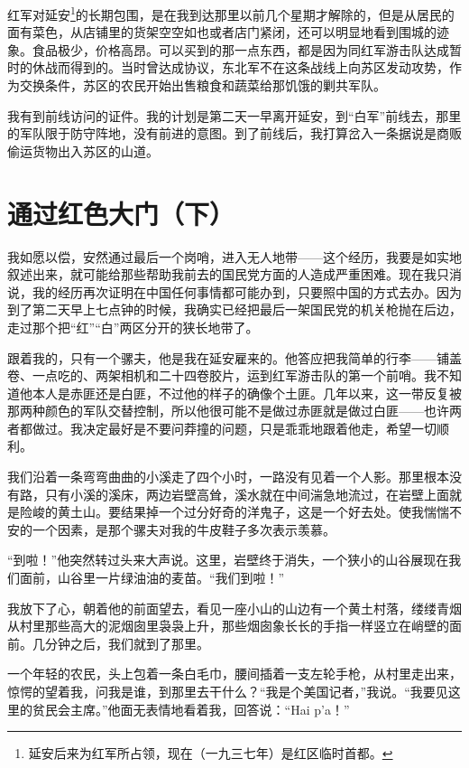 \documentclass[10pt]{book}
\begin{document}
红军对延安\footnote{延安后来为红军所占领，现在（一九三七年）是红区临时首都。}的长期包围，是在我到达那里以前几个星期才解除的，但是从居民的面有菜色，从店铺里的货架空空如也或者店门紧闭，还可以明显地看到围城的迹象。食品极少，价格高昂。可以买到的那一点东西，都是因为同红军游击队达成暂时的休战而得到的。当时曾达成协议，东北军不在这条战线上向苏区发动攻势，作为交换条件，苏区的农民开始出售粮食和蔬菜给那饥饿的剿共军队。

我有到前线访问的证件。我的计划是第二天一早离开延安，到“白军”前线去，那里的军队限于防守阵地，没有前进的意图。到了前线后，我打算岔入一条据说是商贩偷运货物出入苏区的山道。



\section{通过红色大门（下）}

我如愿以偿，安然通过最后一个岗哨，进入无人地带——这个经历，我要是如实地叙述出来，就可能给那些帮助我前去的国民党方面的人造成严重困难。现在我只消说，我的经历再次证明在中国任何事情都可能办到，只要照中国的方式去办。因为到了第二天早上七点钟的时候，我确实已经把最后一架国民党的机关枪抛在后边，走过那个把“红”“白”两区分开的狭长地带了。

跟着我的，只有一个骡夫，他是我在延安雇来的。他答应把我简单的行李——铺盖卷、一点吃的、两架相机和二十四卷胶片，运到红军游击队的第一个前哨。我不知道他本人是赤匪还是白匪，不过他的样子的确像个土匪。几年以来，这一带反复被那两种颜色的军队交替控制，所以他很可能不是做过赤匪就是做过白匪——也许两者都做过。我决定最好是不要问莽撞的问题，只是乖乖地跟着他走，希望一切顺利。

我们沿着一条弯弯曲曲的小溪走了四个小时，一路没有见着一个人影。那里根本没有路，只有小溪的溪床，两边岩壁高耸，溪水就在中间湍急地流过，在岩壁上面就是险峻的黄土山。要结果掉一个过分好奇的洋鬼子，这是一个好去处。使我惴惴不安的一个因素，是那个骡夫对我的牛皮鞋子多次表示羡慕。

“到啦！”他突然转过头来大声说。这里，岩壁终于消失，一个狭小的山谷展现在我们面前，山谷里一片绿油油的麦苗。“我们到啦！”

我放下了心，朝着他的前面望去，看见一座小山的山边有一个黄土村落，缕缕青烟从村里那些高大的泥烟囱里袅袅上升，那些烟囱象长长的手指一样竖立在峭壁的面前。几分钟之后，我们就到了那里。

一个年轻的农民，头上包着一条白毛巾，腰间插着一支左轮手枪，从村里走出来，惊愕的望着我，问我是谁，到那里去干什么？“我是个美国记者，”我说。“我要见这里的贫民会主席。”他面无表情地看着我，回答说：“Hai p'a！”
\end{document}
